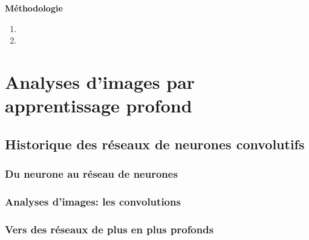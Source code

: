 \setcounter{section}{0} %
\renewcommand*{\theHsection}{chY.\the\value{section}}
\centerline{\bfseries\textcolor{bleusection}{ \Huge Méthodologie}}  

\bigskip


{\LARGE
\begin{enumerate}[label=\textcolor{bleusection}{\arabic*}{.}, leftmargin=2cm]
  \item {}
  \item {}
\end{enumerate}
}

\clearpage
\pagestyle{methodo}

\section[Analyses d'images]{Analyses d'images par apprentissage profond}\label{methodes.1}
\subsection{Historique des réseaux de neurones convolutifs}
\subsubsection{Du neurone au réseau de neurones}
\subsubsection{Analyses d'images: les convolutions}
\subsubsection{Vers des réseaux de plus en plus profonds}

